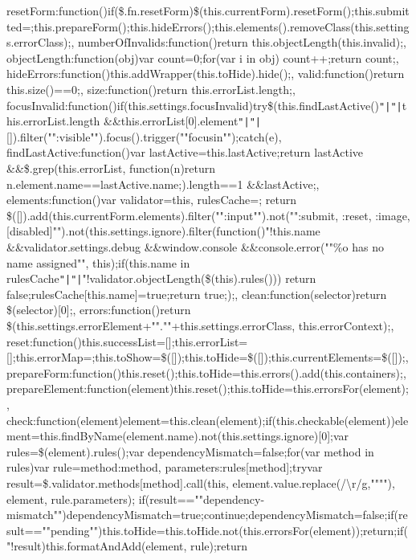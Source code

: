 reset\+Form\+:function()\lcurly{}if(\$.\+fn.\+reset\+Form)\$(this.\+current\+Form).\+reset\+Form();this.\+submitted=\lcurly{}\rcurly{};this.\+prepare\+Form();this.\+hide\+Errors();this.\+elements().\+remove\+Class(this.\+settings.\+error\+Class);\rcurly{}, number\+Of\+Invalids\+:function()\lcurly{}return this.\+object\+Length(this.\+invalid);\rcurly{}, object\+Length\+:function(obj)\lcurly{}var count=0;for(var i in obj) count++;return count;\rcurly{}, hide\+Errors\+:function()\lcurly{}this.\+add\+Wrapper(this.\+to\+Hide).\+hide();\rcurly{}, valid\+:function()\lcurly{}return this.\+size()==0;\rcurly{}, size\+:function()\lcurly{}return this.\+error\+List.\+length;\rcurly{}, focus\+Invalid\+:function()\lcurly{}if(this.\+settings.\+focus\+Invalid)\lcurly{}try\lcurly{}\$(this.\+find\+Last\+Active()\texttt{"|}\texttt{"|}this.\+error\+List.\+length \&\&this.\+error\+List[0].\+element\texttt{"|}\texttt{"|}[]).\+filter(""\+:visible"").\+focus().\+trigger(""focusin"");\rcurly{}catch(e)\lcurly{}\rcurly{}\rcurly{}\rcurly{}, find\+Last\+Active\+:function()\lcurly{}var last\+Active=this.\+last\+Active;return last\+Active \&\&\$.\+grep(this.\+error\+List, function(n)\lcurly{}return n.\+element.\+name==last\+Active.\+name;\rcurly{}).\+length==1 \&\&last\+Active;\rcurly{}, elements\+:function()\lcurly{}var validator=this, rules\+Cache=\lcurly{}\rcurly{};   return \$([]).\+add(this.\+current\+Form.\+elements).\+filter(""\+:input"").\+not(""\+:submit, \+:reset, \+:image, [disabled]"").\+not(this.\+settings.\+ignore).\+filter(function()\lcurly{}"!this.\+name \&\&validator.\+settings.\+debug \&\&window.\+console \&\&console.\+error(""\%o has no name assigned"", this);if(this.\+name in rules\+Cache\texttt{"|}\texttt{"|}"!validator.\+object\+Length(\$(this).\+rules())) return false;rules\+Cache[this.\+name]=true;return true;\rcurly{});\rcurly{}, clean\+:function(selector)\lcurly{}return \$(selector)[0];\rcurly{}, errors\+:function()\lcurly{}return \$(this.\+settings.\+error\+Element+"".""+this.\+settings.\+error\+Class, this.\+error\+Context);\rcurly{}, reset\+:function()\lcurly{}this.\+success\+List=[];this.\+error\+List=[];this.\+error\+Map=\lcurly{}\rcurly{};this.\+to\+Show=\$([]);this.\+to\+Hide=\$([]);this.\+current\+Elements=\$([]);\rcurly{}, prepare\+Form\+:function()\lcurly{}this.\+reset();this.\+to\+Hide=this.\+errors().\+add(this.\+containers);\rcurly{}, prepare\+Element\+:function(element)\lcurly{}this.\+reset();this.\+to\+Hide=this.\+errors\+For(element);\rcurly{}, check\+:function(element)\lcurly{}element=this.\+clean(element);if(this.\+checkable(element))\lcurly{}element=this.\+find\+By\+Name(element.\+name).\+not(this.\+settings.\+ignore)[0];\rcurly{}var rules=\$(element).\+rules();var dependency\+Mismatch=false;for(var method in rules)\lcurly{}var rule=\lcurly{}method\+:method, parameters\+:rules[method]\rcurly{};try\lcurly{}var result=\$.\+validator.\+methods[method].\+call(this, element.\+value.\+replace(/\textbackslash{}r/g,""""), element, rule.\+parameters);   if(result==""dependency-\/mismatch"")\lcurly{}dependency\+Mismatch=true;continue;\rcurly{}dependency\+Mismatch=false;if(result==""pending"")\lcurly{}this.\+to\+Hide=this.\+to\+Hide.\+not(this.\+errors\+For(element));return;\rcurly{}if("!result)\lcurly{}this.\+format\+And\+Add(element, rule);return 